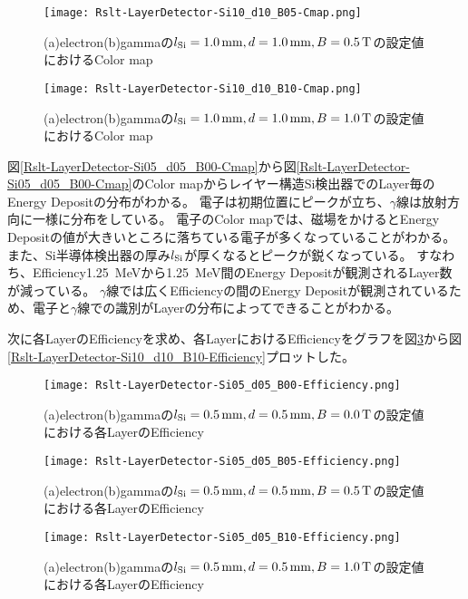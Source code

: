 \documentclass[a4paper,10pt]{jreport}
\begin{document}
\begin{figure}[H]
	\center
	\texttt{[image: Rslt-LayerDetector-Si10\_d10\_B05-Cmap.png]}
	\caption{(a)electron(b)gammaの$l_{\rm{Si}}=\SI{1.0}{mm}, d=\SI{1.0}{mm}, B=\SI{0.5}{T}$の設定値におけるColor map}
	\label{Rslt-LayerDetector-Si10_d10_B05-Cmap}
\end{figure}

\begin{figure}[H]
	\center
	\texttt{[image: Rslt-LayerDetector-Si10\_d10\_B10-Cmap.png]}
	\caption{(a)electron(b)gammaの$l_{\rm{Si}}=\SI{1.0}{mm}, d=\SI{1.0}{mm}, B=\SI{1.0}{T}$の設定値におけるColor map}
	\label{Rslt-LayerDetector-Si10_d10_B10-Cmap}
\end{figure}

図\ref{Rslt-LayerDetector-Si05_d05_B00-Cmap}から図\ref{Rslt-LayerDetector-Si05_d05_B00-Cmap}のColor mapからレイヤー構造Si検出器でのLayer毎のEnergy Depositの分布がわかる。
電子は初期位置にピークが立ち、$\gamma$線は放射方向に一様に分布をしている。
電子のColor mapでは、磁場をかけるとEnergy Depositの値が大きいところに落ちている電子が多くなっていることがわかる。
また、Si半導体検出器の厚み$l_{\rm{Si}}$が厚くなるとピークが鋭くなっている。
すなわち、Efficiency\SI{1.25}{MeV}から\SI{1.25}{MeV}間のEnergy Depositが観測されるLayer数が減っている。
$\gamma$線では広くEfficiencyの間のEnergy Depositが観測されているため、電子と$\gamma$線での識別がLayerの分布によってできることがわかる。

次に各LayerのEfficiencyを求め、各LayerにおけるEfficiencyをグラフを図\ref{Rslt-LayerDetector-Si05_d05_B00-Efficiency}から図\ref{Rslt-LayerDetector-Si10_d10_B10-Efficiency}プロットした。

\begin{figure}[H]
	\center
	\texttt{[image: Rslt-LayerDetector-Si05\_d05\_B00-Efficiency.png]}
	\caption{(a)electron(b)gammaの$l_{\rm{Si}}=\SI{0.5}{mm}, d=\SI{0.5}{mm}, B=\SI{0.0}{T}$の設定値における各LayerのEfficiency}
	\label{Rslt-LayerDetector-Si05_d05_B00-Efficiency}
\end{figure}

\begin{figure}[H]
	\center
	\texttt{[image: Rslt-LayerDetector-Si05\_d05\_B05-Efficiency.png]}
	\caption{(a)electron(b)gammaの$l_{\rm{Si}}=\SI{0.5}{mm}, d=\SI{0.5}{mm}, B=\SI{0.5}{T}$の設定値における各LayerのEfficiency}
	\label{Rslt-LayerDetector-Si05_d05_B05-Efficiency}
\end{figure}

\begin{figure}[H]
	\center
	\texttt{[image: Rslt-LayerDetector-Si05\_d05\_B10-Efficiency.png]}
	\caption{(a)electron(b)gammaの$l_{\rm{Si}}=\SI{0.5}{mm}, d=\SI{0.5}{mm}, B=\SI{1.0}{T}$の設定値における各LayerのEfficiency}
	\label{Rslt-LayerDetector-Si05_d05_B10-Efficiency}
\end{figure}
\end{document}
